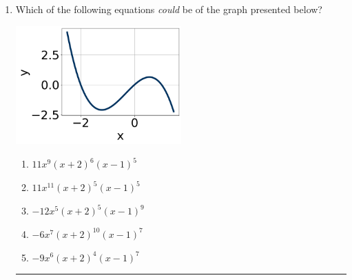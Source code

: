 \documentclass[14pt]{extbook}
\newcommand{\litem}[1]{\item#1\hspace*{-1cm}\rule{\textwidth}{0.4pt}}
\begin{document}
\begin{enumerate}
{\begin{enumerate}[label=\Alph*.]
\end{enumerate} }
\litem{
Which of the following equations \textit{could} be of the graph presented below?
\begin{center}
    \includegraphics[width=0.5\textwidth]{../Figures/polyGraphToFunctionC.png}
\end{center}
\begin{enumerate}[label=\Alph*.]
\item \( 11x^{9} (x + 2)^{6} (x - 1)^{5} \)
\item \( 11x^{11} (x + 2)^{5} (x - 1)^{5} \)
\item \( -12x^{5} (x + 2)^{5} (x - 1)^{9} \)
\item \( -6x^{7} (x + 2)^{10} (x - 1)^{7} \)
\item \( -9x^{6} (x + 2)^{4} (x - 1)^{7} \)


\end{enumerate}}
\end{enumerate}
\end{document}
